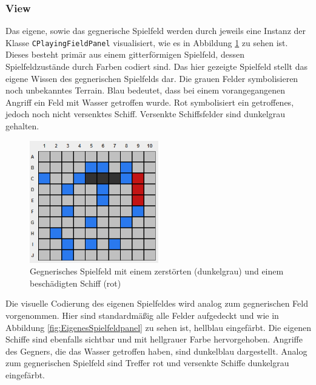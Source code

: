 
\subsubsection{View}

Das eigene, sowie das gegnerische Spielfeld werden durch jeweils eine Instanz der Klasse \texttt{CPlayingFieldPanel} visualisiert, wie es in Abbildung \ref{fig:Spielfeldpanel} zu sehen ist.
Dieses besteht primär aus einem gitterförmigen Spielfeld, dessen Spielfeldzustände durch Farben codiert sind.
Das hier gezeigte Spielfeld stellt das eigene Wissen des gegnerischen Spielfelds dar.
Die grauen Felder symbolisieren noch unbekanntes Terrain.
Blau bedeutet, dass bei einem vorangegangenen Angriff ein Feld mit Wasser getroffen wurde.
Rot symbolisiert ein getroffenes, jedoch noch nicht versenktes Schiff.
Versenkte Schiffsfelder sind dunkelgrau gehalten.

\begin{figure}[H]
  \centering
  \includegraphics[width=0.5\textwidth]{images/JavaPlayingFieldPanel.png}
  \caption{Gegnerisches Spielfeld mit einem zerstörten (dunkelgrau) und einem beschädigten Schiff (rot)}
  \label{fig:Spielfeldpanel}
\end{figure}

Die visuelle Codierung des eigenen Spielfeldes wird analog zum gegnerischen Feld vorgenommen.
Hier sind standardmäßig alle Felder aufgedeckt und wie in Abbildung \ref{fig:EigenesSpielfeldpanel} zu sehen ist, hellblau eingefärbt.
Die eigenen Schiffe sind ebenfalls sichtbar und mit hellgrauer Farbe hervorgehoben.
Angriffe des Gegners, die das Wasser getroffen haben, sind dunkelblau dargestellt.
Analog zum gegnerischen Spielfeld sind Treffer rot und versenkte Schiffe dunkelgrau eingefärbt.

